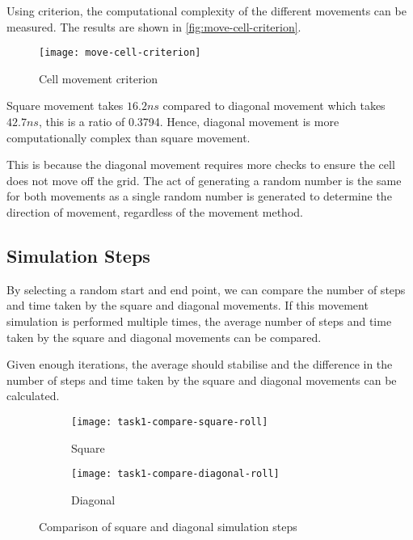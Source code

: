 Using criterion, the computational complexity of the different movements can be measured.
The results are shown in \autoref{fig:move-cell-criterion}.

\begin{figure}[ht]
    \centering
    \texttt{[image: move-cell-criterion]}
    \caption[Cell movement criterion]{Cell movement criterion}
    \label{fig:move-cell-criterion}
\end{figure}

Square movement takes $16.2ns$ compared to diagonal movement which takes $42.7ns$, 
this is a ratio of 0.3794.
Hence, diagonal movement is more computationally complex than square movement.

This is because the diagonal movement requires more checks to ensure the cell does not move off the grid.
The act of generating a random number is the same for both movements as a single random number is generated to determine the direction of movement, regardless of the movement method.

\clearpage

\subsection{Simulation Steps}

By selecting a random start and end point, we can compare the number of steps and time taken by the square and diagonal movements.
If this movement simulation is performed multiple times, the average number of steps and time taken by the square and diagonal movements can be compared.

Given enough iterations, the average should stabilise and the difference in the number of steps and time taken by the square and diagonal movements can be calculated.

\begin{figure}[ht]
    \centering
    \begin{subfigure}{\textwidth}
        \texttt{[image: task1-compare-square-roll]}
        \caption[Square]{Square}
        \label{fig:task1-compare-square-roll}
    \end{subfigure}

    \begin{subfigure}{\textwidth}
        \texttt{[image: task1-compare-diagonal-roll]}
        \caption[Diagonal]{Diagonal}
        \label{fig:task1-compare-diagonal-roll}
    \end{subfigure}

    \caption[Comparison of square and diagonal simulation steps]{Comparison of square and diagonal simulation steps}
    \label{fig:task1-compare-roll}
\end{figure}

